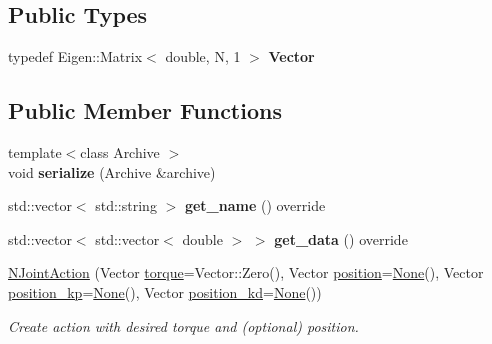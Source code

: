 \subsection*{Public Types}
\begin{DoxyCompactItemize}
\item 
\mbox{\label{structrobot__interfaces_1_1NJointAction_afdfe44811a3d9063f2a12dc05be515cb}} 
typedef Eigen\+::\+Matrix$<$ double, N, 1 $>$ {\bfseries Vector}
\end{DoxyCompactItemize}
\subsection*{Public Member Functions}
\begin{DoxyCompactItemize}
\item 
\mbox{\label{structrobot__interfaces_1_1NJointAction_aca14e1c3aa3f7ac545405e8a5c9575a6}} 
{\footnotesize template$<$class Archive $>$ }\\void {\bfseries serialize} (Archive \&archive)
\item 
\mbox{\label{structrobot__interfaces_1_1NJointAction_a8c19d0c69b6fac9a86e7a0017d275ac4}} 
std\+::vector$<$ std\+::string $>$ {\bfseries get\+\_\+name} () override
\item 
\mbox{\label{structrobot__interfaces_1_1NJointAction_a309b4188b2a508aa85cbedb0f6ef6343}} 
std\+::vector$<$ std\+::vector$<$ double $>$ $>$ {\bfseries get\+\_\+data} () override
\item 
\hyperlink{structrobot__interfaces_1_1NJointAction_a518f1d5bd4161809c176a4007f58fb0d}{N\+Joint\+Action} (Vector \hyperlink{structrobot__interfaces_1_1NJointAction_aab60be78c0008092bf3f36b92a25245d}{torque}=Vector\+::\+Zero(), Vector \hyperlink{structrobot__interfaces_1_1NJointAction_a1ba640ac58fef08cd8a5c964b7a4096f}{position}=\hyperlink{structrobot__interfaces_1_1NJointAction_abb5403bb946dc4b9e9e5e13b9195ad86}{None}(), Vector \hyperlink{structrobot__interfaces_1_1NJointAction_a4100b04d42c8e1d9b04ba141212c3461}{position\+\_\+kp}=\hyperlink{structrobot__interfaces_1_1NJointAction_abb5403bb946dc4b9e9e5e13b9195ad86}{None}(), Vector \hyperlink{structrobot__interfaces_1_1NJointAction_a652131480e656840e53f8709dae9c487}{position\+\_\+kd}=\hyperlink{structrobot__interfaces_1_1NJointAction_abb5403bb946dc4b9e9e5e13b9195ad86}{None}())
\begin{DoxyCompactList}\small\item\em Create action with desired torque and (optional) position. \end{DoxyCompactList}\end{DoxyCompactItemize}
